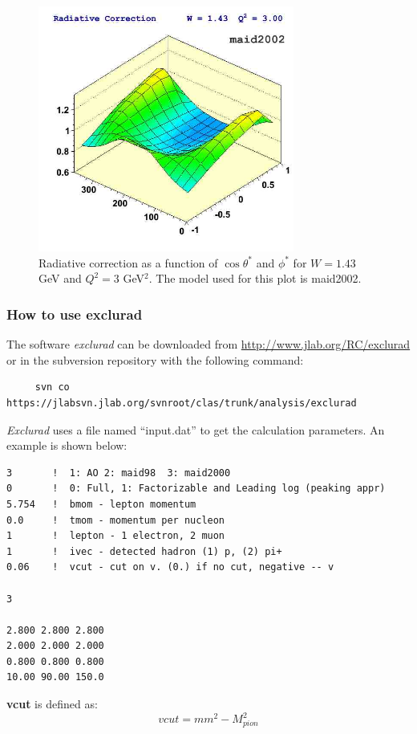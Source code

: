 \begin{figure}[h]
  \centering
                \includegraphics[width=0.75\textwidth ]{img/rad_cor_thetaphi_W_143_Q2_3maid2002.jpg}
                \caption{Radiative correction as a function of
	             $\cos\theta^*$ and $\phi^*$ for $W=1.43$ GeV and $Q^2=3$ GeV$^2$. The model used for
                this plot is maid2002.}
                \label{fig:rad_cor_thetaphi_W_143_Q2_300maid2002}
\end{figure}



\clearpage\newpage
\subsubsection{How to use exclurad}
The software {\it exclurad} can be downloaded from \href{http://www.jlab.org/RC/exclurad}{http://www.jlab.org/RC/exclurad}
or in the subversion repository with the following command:

\begin{verbatim}
     svn co  https://jlabsvn.jlab.org/svnroot/clas/trunk/analysis/exclurad
\end{verbatim}

{\it Exclurad} uses a file named ``input.dat'' to get the calculation parameters. An example is shown below:
\vspace{0.6cm}
\begin{verbatim}
3       !  1: AO 2: maid98  3: maid2000
0       !  0: Full, 1: Factorizable and Leading log (peaking appr)
5.754   !  bmom - lepton momentum
0.0     !  tmom - momentum per nucleon
1       !  lepton - 1 electron, 2 muon
1       !  ivec - detected hadron (1) p, (2) pi+
0.06    !  vcut - cut on v. (0.) if no cut, negative -- v

3

2.800 2.800 2.800
2.000 2.000 2.000
0.800 0.800 0.800
10.00 90.00 150.0
\end{verbatim}\vspace{0.6cm}
{\bf vcut} is defined as:
\begin{equation}\label{eq:vcut}
	vcut = mm^2 - M_{pion}^2
\end{equation}

